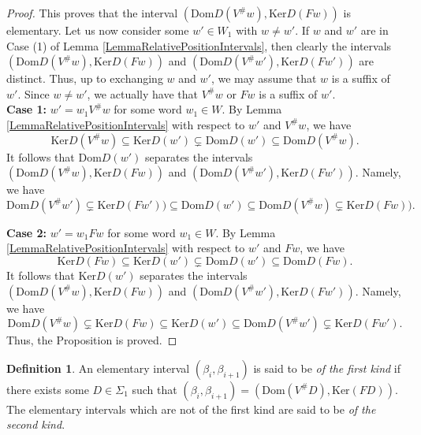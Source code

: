 \documentclass[12pt]{amsart}
\theoremstyle{definition}
\newtheorem{definition}[theorem]{Definition}
\newcommand{\<}{\langle}   %
\renewcommand{\>}{\rangle} %
\begin{document}
\begin{proof}
    This proves that the interval $(\mathrm{Dom}D(V^{\#}w),\mathrm{Ker}D(Fw))$ is elementary. Let us now consider some $w' \in W_1$ with $w \not = w'$. If $w$ and $w'$ are in Case (1) of Lemma \ref{LemmaRelativePositionIntervals}, then clearly the intervals $(\mathrm{Dom}D(V^{\#}w),\mathrm{Ker}D(Fw))$ and $(\mathrm{Dom}D(V^{\#}w'),\mathrm{Ker}D(Fw'))$ are distinct. Thus, up to exchanging $w$ and $w'$, we may assume that $w$ is a suffix of $w'$. Since $w \not = w'$, we actually have that $V^{\#}w$ or $Fw$ is a suffix of $w'$.\\

    \textbf{Case 1:} $w' = w_1V^{\#}w$ for some word $w_1 \in W$. By Lemma \ref{LemmaRelativePositionIntervals} with respect to $w'$ and $V^{\#}w$, we have 
    \begin{equation*}
        \mathrm{Ker}D(V^{\#}w) \subseteq  \mathrm{Ker}D(w') \subsetneq \mathrm{Dom}D(w') \subseteq  \mathrm{Dom}D(V^{\#}w).
    \end{equation*}
    \sloppy It follows that $\mathrm{Dom}D(w')$ separates the intervals $(\mathrm{Dom}D(V^{\#}w),\mathrm{Ker}D(Fw))$ and $(\mathrm{Dom}D(V^{\#}w'),\mathrm{Ker}D(Fw'))$. Namely, we have 
    \begin{equation*}
        \mathrm{Dom}D(V^{\#}w') \subsetneq \mathrm{Ker}D(Fw')) \subseteq  \mathrm{Dom}D(w') \subseteq  \mathrm{Dom}D(V^{\#}w) \subsetneq \mathrm{Ker}D(Fw)).
    \end{equation*}

    \textbf{Case 2:} $w' = w_1Fw$ for some word $w_1 \in W$. By Lemma \ref{LemmaRelativePositionIntervals} with respect to $w'$ and $Fw$, we have 
    \begin{equation*}
        \mathrm{Ker}D(Fw) \subseteq  \mathrm{Ker}D(w') \subsetneq \mathrm{Dom}D(w') \subseteq  \mathrm{Dom}D(Fw).
    \end{equation*}
    \sloppy It follows that $\mathrm{Ker}D(w')$ separates the intervals $(\mathrm{Dom}D(V^{\#}w),\mathrm{Ker}D(Fw))$ and $(\mathrm{Dom}D(V^{\#}w'),\mathrm{Ker}D(Fw'))$. Namely, we have 
    \begin{equation*}
        \mathrm{Dom}D(V^{\#}w) \subsetneq \mathrm{Ker}D(Fw) \subseteq  \mathrm{Ker}D(w') \subseteq  \mathrm{Dom}D(V^{\#}w') \subsetneq \mathrm{Ker}D(Fw').
    \end{equation*}
    Thus, the Proposition is proved.
\end{proof}

\begin{definition}
    An elementary interval $(\beta_i,\beta_{i+1})$ is said to be \textit{of the first kind} if there exists some $D \in \Sigma_1$ such that $(\beta_i,\beta_{i+1}) = (\mathrm{Dom}(V^{\#}D),\mathrm{Ker}(FD))$. The elementary intervals which are not of the first kind are said to be \textit{of the second kind}.
\end{definition}
\end{document}
